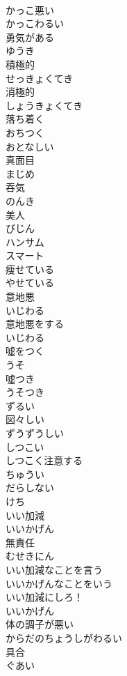 \documentclass[8pt]{extreport}
\begin{document}
\begin{CJK}{UTF8}{min}
\\	かっこ悪い	
\\	かっこわるい
\\	勇気がある	
\\	ゆうき
\\	積極的	
\\	せっきょくてき
\\	消極的	
\\	しょうきょくてき
\\	落ち着く	
\\	おちつく
\\	おとなしい	
\\	真面目	
\\	まじめ
\\	吞気	
\\	のんき
\\	美人	
\\	びじん
\\	ハンサム	
\\	スマート	
\\	瘦せている	
\\	やせている
\\	意地悪	
\\	いじわる
\\	意地悪をする	
\\	いじわる
\\	噓をつく	
\\	うそ
\\	噓つき	
\\	うそつき
\\	ずるい	
\\	図々しい	
\\	ずうずうしい
\\	しつこい	
\\	しつこく注意する	
\\	ちゅうい
\\	だらしない	
\\	けち	
\\	いい加減	
\\	いいかげん
\\	無責任	
\\	むせきにん
\\	いい加減なことを言う	
\\	いいかげんなことをいう
\\	いい加減にしろ！	
\\	いいかげん
\\	体の調子が悪い	
\\	からだのちょうしがわるい
\\	具合	
\\	ぐあい

\end{CJK}
\end{document}
